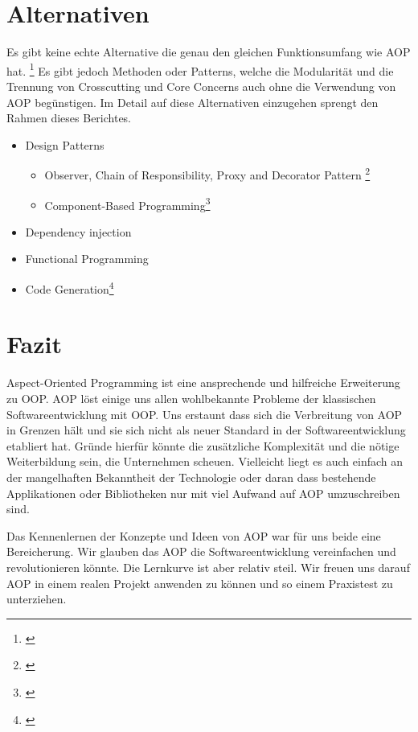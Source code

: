 \section{Alternativen}
Es gibt keine echte Alternative die genau den gleichen Funktionsumfang wie AOP hat. \footnote{\cite{bruce:alternatives}} Es gibt jedoch Methoden oder Patterns, welche die Modularität und die Trennung von Crosscutting und Core Concerns auch ohne die Verwendung von AOP begünstigen. Im Detail auf diese Alternativen einzugehen sprengt den Rahmen dieses Berichtes. 
\begin{itemize}
\item Design Patterns
\begin{itemize}
\item Observer, Chain of Responsibility, Proxy and Decorator Pattern \footnote{\cite[p~66]{laddad:aspectj}}
\item Component-Based Programming\footnote{\cite{wiki:componentbased}} 
\end{itemize}
\item Dependency injection
\item Functional Programming
\item Code Generation\footnote{\cite{aop:alternatives}}
\end{itemize}

\section{Fazit}
Aspect-Oriented Programming ist eine ansprechende und hilfreiche Erweiterung zu OOP. AOP löst einige uns allen wohlbekannte Probleme der klassischen Softwareentwicklung mit OOP. Uns erstaunt dass sich die Verbreitung von AOP in Grenzen hält und sie sich nicht als neuer Standard in der Softwareentwicklung etabliert hat. Gründe hierfür könnte die zusätzliche Komplexität und die nötige Weiterbildung sein, die Unternehmen  scheuen. Vielleicht liegt es auch einfach an der mangelhaften Bekanntheit der Technologie oder daran dass bestehende Applikationen oder Bibliotheken nur mit viel Aufwand auf AOP umzuschreiben sind.

Das Kennenlernen der Konzepte und Ideen von AOP war für uns beide eine Bereicherung. Wir glauben das AOP die Softwareentwicklung vereinfachen und revolutionieren könnte. Die Lernkurve ist aber relativ steil. Wir freuen uns darauf AOP in einem realen Projekt anwenden zu können und so einem Praxistest zu unterziehen.